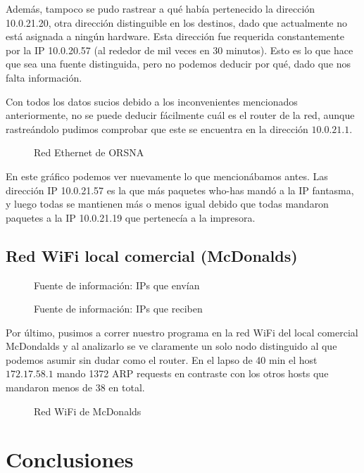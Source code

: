 \documentclass[a4paper, 11pt]{article}
\newcommand{\ponerGrafico}[4]
{\begin{figure}[H]
  \centering
  \subfloat{\hspace{-3.5cm}\texttt{[image: \#1]}}
  \caption{#2} \label{fig:#4}
\end{figure}
}
\begin{document}
Adem\'as, tampoco se pudo rastrear a qu\'e hab\'ia pertenecido la direcci\'on 10.0.21.20, otra direcci\'on distinguible en los destinos, dado que actualmente no est\'a asignada a ning\'un hardware. Esta direcci\'on fue requerida constantemente por la IP 10.0.20.57 (al rededor de mil veces en 30 minutos). Esto es lo que hace que sea una fuente distinguida, pero no podemos deducir por qu\'e, dado que nos falta informaci\'on.

Con todos los datos sucios debido a los inconvenientes mencionados anteriormente, no se puede deducir f\'acilmente  cu\'al es el router de la red, aunque rastre\'andolo pudimos comprobar que este se encuentra en la direcci\'on $10.0.21.1$.

\ponerGrafico{graficos/orsna_grafo.png}{Red Ethernet de ORSNA}{0.5}{label}

En este gr\'afico podemos ver nuevamente lo que mencion\'abamos antes. Las direcci\'on IP 10.0.21.57 es la que m\'as paquetes who-has mand\'o a la IP fantasma, y luego todas se mantienen m\'as o menos igual debido que todas mandaron paquetes a la IP 10.0.21.19 que pertenec\'ia a la impresora.

\subsection{Red WiFi local comercial (McDonalds)}
\ponerGrafico{graficos/mcdonalds_entropia.png}{Fuente de informaci\'on: IPs que env\'ian}{0.5}{label}
\ponerGrafico{graficos/mcdonalds_entropia_rcv.png}{Fuente de informaci\'on: IPs que reciben}{0.5}{label}

Por \'ultimo, pusimos a correr nuestro programa en la red WiFi del local comercial McDondalds y al analizarlo se ve claramente un solo nodo distinguido al que podemos asumir sin dudar como el router. En el lapso de 40 min el host $172.17.58.1$ mando 1372 ARP requests en contraste con los otros hosts que mandaron menos de 38 en total.  

\ponerGrafico{graficos/mcdonalds_grafo.png}{Red WiFi de McDonalds}{0.5}{label}

\section{Conclusiones}
\end{document}
